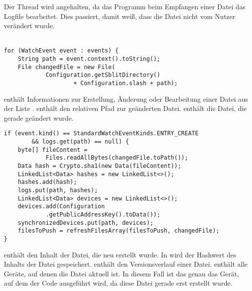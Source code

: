 Der Thread wird angehalten, da das Programm beim Empfangen einer Datei das Logfile bearbeitet. Dies passiert, damit \sblit weiß, dass die Datei nicht vom Nutzer verändert wurde. \\ \\
\javalisting
\begin{minipage}{\linewidth}
\begin{lstlisting}[caption={Unterteilen in einzelne Dateien},captionpos=b]
for (WatchEvent event : events) {
	String path = event.context().toString();
	File changedFile = new File(
			Configuration.getSblitDirectory()
					+ Configuration.slash + path);
\end{lstlisting}
\end{minipage}
\begin{description}
	 enthält Informationen zur Erstellung, Änderung oder Bearbeitung einer Datei aus der Liste . 
	 enthält den relativen Pfad zur geänderten Datei.
	 enthält die Datei, die gerade geändert wurde.
\end{description}
\javalisting
\begin{minipage}{\linewidth}
\begin{lstlisting}[caption={Erstellen einer Datei},captionpos=b]
if (event.kind() == StandardWatchEventKinds.ENTRY_CREATE 
		&& logs.get(path) == null) {
	byte[] fileContent = 
			Files.readAllBytes(changedFile.toPath());
	Data hash = Crypto.sha1(new Data(fileContent));
	LinkedList<Data> hashes = new LinkedList<>();
	hashes.add(hash);
	logs.put(path, hashes);
	LinkedList<Data> devices = new LinkedList<>();
	devices.add(Configuration
			.getPublicAddressKey().toData());
	synchronizedDevices.put(path, devices);
	filesToPush = refreshFilesArray(filesToPush, changedFile);
}
\end{lstlisting}
\end{minipage}	
\begin{description}
	 enthält den Inhalt der Datei, die neu erstellt wurde.
	In  wird der Hashwert des Inhalts der Datei gespeichert.
	 enthält den Versionsverlauf einer Datei. 
	 enthält alle Geräte, auf denen die Datei aktuell ist. In diesem Fall ist das genau das Gerät, auf dem der Code ausgeführt wird, da diese Datei gerade erst erstellt wurde.
\end{description}
